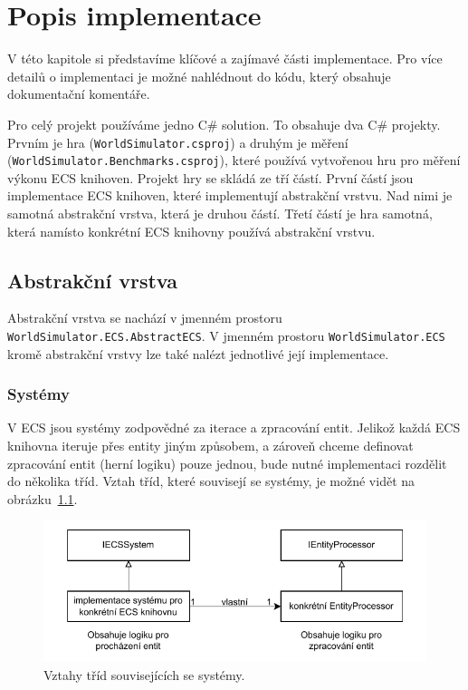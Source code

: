 \chapter{Popis implementace}
V této kapitole si představíme klíčové a zajímavé části implementace. Pro více detailů o implementaci je možné nahlédnout do kódu, který obsahuje dokumentační komentáře.

Pro celý projekt používáme jedno C\# solution. To obsahuje dva C\# projekty. Prvním je hra (\texttt{WorldSimulator.csproj}) a druhým je měření (\texttt{WorldSimulator.Benchmarks.csproj}), které používá vytvořenou hru pro měření výkonu ECS knihoven. Projekt hry se skládá ze tří částí. První částí jsou implementace ECS knihoven, které implementují abstrakční vrstvu. Nad nimi je samotná abstrakční vrstva, která je druhou částí. Třetí částí je hra samotná, která namísto konkrétní ECS knihovny používá abstrakční vrstvu.

\section{Abstrakční vrstva}
\label{sec:abstract-layer}
Abstrakční vrstva se nachází v jmenném prostoru \texttt{WorldSimulator.ECS.AbstractECS}. V jmenném prostoru \texttt{WorldSimulator.ECS} kromě abstrakční vrstvy lze také nalézt jednotlivé její implementace.

\subsection{Systémy}
V ECS jsou systémy zodpovědné za iterace a zpracování entit. Jelikož každá ECS knihovna iteruje přes entity jiným způsobem, a zároveň chceme definovat zpracování entit (herní logiku) pouze jednou, bude nutné implementaci rozdělit do několika tříd. Vztah tříd, které souvisejí se systémy, je možné vidět na obrázku~\ref{fig:abstract-layer-systems}.

\begin{figure}[!htb]
  \centering
  \includegraphics[width=0.8\linewidth]{img/abstract-layer-systems.pdf}
  \caption{Vztahy tříd souvisejících se systémy.}
  \label{fig:abstract-layer-systems}
\end{figure}

